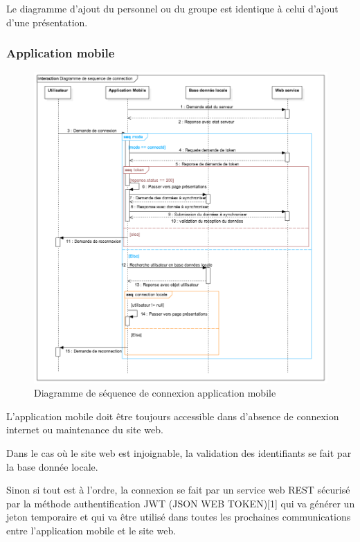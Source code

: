 \documentclass[12pt, ChapStyle1, oneside]{./Styles/Dea_Gsm}
\begin{document}
Le diagramme d'ajout du personnel ou du groupe est identique à celui d'ajout d'une présentation.

\vspace{15cm}

\subsubsection{Application mobile}


\begin{figure}[H]
    \centering
    \includegraphics[width=6in]{diagsequenceloginmobile}
    \caption{Diagramme de séquence de connexion application mobile}
    \label{diagdeploit}
\end{figure}
L'application mobile doit être toujours accessible dans d’absence de connexion internet ou maintenance du site web.


Dans le cas où le site web est injoignable, la validation des identifiants se fait par la base donnée locale.




Sinon si tout est à l’ordre, la connexion se fait par un service web REST sécurisé par la méthode authentification JWT (JSON WEB TOKEN)[1] qui va générer un jeton temporaire et qui va être utilisé dans toutes les prochaines communications entre l’application mobile et le site web.
\end{document}
